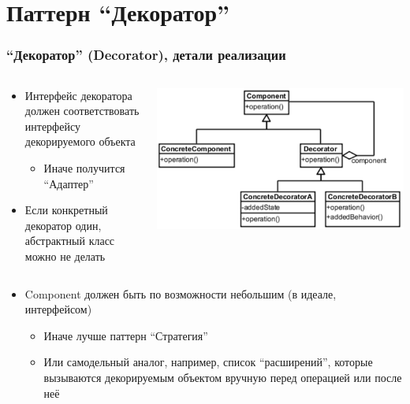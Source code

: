 \documentclass[xetex,mathserif,serif]{beamer}
\begin{document}
	\section{Паттерн ``Декоратор''}

	\begin{frame}
		\frametitle{``Декоратор'' (Decorator), детали реализации}
		\begin{columns}
			\begin{column}{0.6\textwidth}
				\begin{itemize}
					\item Интерфейс декоратора должен соответствовать интерфейсу декорируемого объекта
					\begin{itemize}
						\item Иначе получится ``Адаптер''
					\end{itemize}
					\item Если конкретный декоратор один, абстрактный класс можно не делать
				\end{itemize}
			\end{column}
			\begin{column}{0.4\textwidth}
				\begin{center}
					\includegraphics[width=\textwidth]{decorator.png}
				\end{center}
			\end{column}
		\end{columns}
		\begin{itemize}
			\item Component должен быть по возможности небольшим (в идеале, интерфейсом)
			\begin{itemize}
				\item Иначе лучше паттерн ``Стратегия''
				\item Или самодельный аналог, например, список ``расширений'', которые вызываются декорируемым объектом вручную перед операцией или после неё
			\end{itemize}
		\end{itemize}
	\end{frame}
\end{document}
